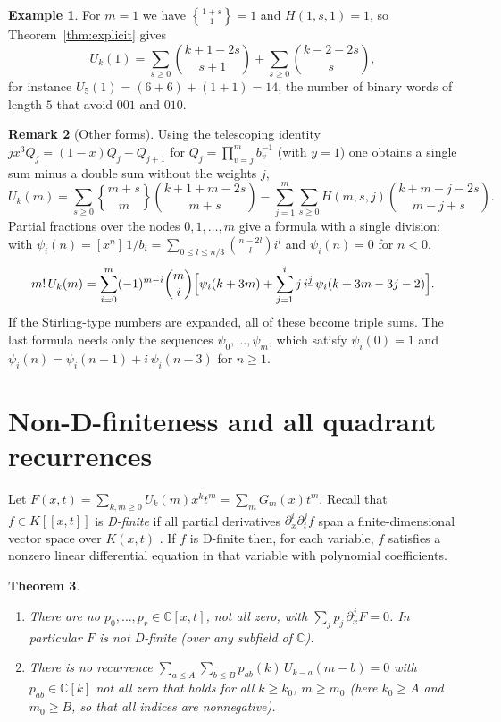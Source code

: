 \documentclass[11pt]{amsart}
\newtheorem{theorem}{Theorem}[section]
\theoremstyle{definition}
\newtheorem{remark}[theorem]{Remark}
\newtheorem{example}[theorem]{Example}
\newcommand{\stirling}[2]{\genfrac{\{}{\}}{0pt}{}{#1}{#2}}
\newcommand{\C}{\mathbb{C}}
\begin{document}
\begin{example}\label{ex:m1}
For $m=1$ we have $\stirling{1+s}{1}=1$ and $H(1,s,1)=1$, so Theorem~\ref{thm:explicit} gives
\[
  U_k(1)=\sum_{s\ge0}\binom{k+1-2s}{s+1}+\sum_{s\ge0}\binom{k-2-2s}{s},
\]
for instance $U_5(1)=(6+6)+(1+1)=14$, the number of binary words of length $5$ that avoid $001$ and $010$.
\end{example}

\begin{remark}[Other forms]\label{rem:forms}
Using the telescoping identity $jx^3Q_j=(1-x)Q_j-Q_{j+1}$ for $Q_j=\prod_{v=j}^{m}b_v^{-1}$ (with $y=1$) one obtains a single sum minus a double sum without the weights $j$,
\[
  U_k(m)=\sum_{s\ge0}\stirling{m+s}{m}\binom{k+1+m-2s}{m+s}-\sum_{j=1}^{m}\sum_{s\ge0}H(m,s,j)\binom{k+m-j-2s}{m-j+s}.
\]
Partial fractions over the nodes $0,1,\dots,m$ give a formula with a single division: with $\psi_i(n)=[x^n]\,1/b_i=\sum_{0\le l\le n/3}\binom{n-2l}{l}i^l$ and $\psi_i(n)=0$ for $n<0$,
\[
  m!\,U_k(m)=\sum_{i=0}^{m}(-1)^{m-i}\binom{m}{i}\Bigl[\psi_i(k+3m)+\sum_{j=1}^{i}j\,i^{\underline j}\,\psi_i(k+3m-3j-2)\Bigr].
\]
If the Stirling-type numbers are expanded, all of these become triple sums. The last formula needs only the sequences $\psi_0,\dots,\psi_m$, which satisfy $\psi_i(0)=1$ and $\psi_i(n)=\psi_i(n-1)+i\,\psi_i(n-3)$ for $n\ge1$.
\end{remark}

\section{Non-D-finiteness and all quadrant recurrences}\label{sec:nonD}

Let $F(x,t)=\sum_{k,m\ge0}U_k(m)x^kt^m=\sum_m G_m(x)t^m$. Recall that $f\in K[[x,t]]$ is \emph{D-finite} if all partial derivatives $\partial_x^i\partial_t^jf$ span a finite-dimensional vector space over $K(x,t)$ \cite{Lipshitz}. If $f$ is D-finite then, for each variable, $f$ satisfies a nonzero linear differential equation in that variable with polynomial coefficients.

\begin{theorem}\label{thm:nonD}\leavevmode
\begin{enumerate}
\item There are no $p_0,\dots,p_r\in\C[x,t]$, not all zero, with $\sum_jp_j\,\partial_x^jF=0$. In particular $F$ is not D-finite (over any subfield of $\C$).
\item There is no recurrence $\sum_{a\le A}\sum_{b\le B}p_{ab}(k)\,U_{k-a}(m-b)=0$ with $p_{ab}\in\C[k]$ not all zero that holds for all $k\ge k_0$, $m\ge m_0$ (here $k_0\ge A$ and $m_0\ge B$, so that all indices are nonnegative).
\end{enumerate}
\end{theorem}
\end{document}
